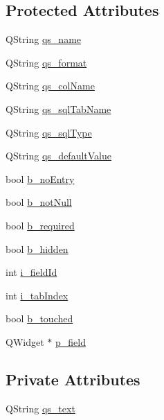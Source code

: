 \subsection*{Protected Attributes}
\begin{DoxyCompactItemize}
\item 
QString \hyperlink{classFormField_a7678a3e5f30d707b47b4b1a23a9bd80d}{qs\_\-name}
\item 
QString \hyperlink{classFormField_ac8f496b75a15cf55a93c5bbd0cd3c037}{qs\_\-format}
\item 
QString \hyperlink{classFormField_ad05d2212596727bd118e8b2c1f57f7b7}{qs\_\-colName}
\item 
QString \hyperlink{classFormField_a525f52fa7e6e96ee123d77eb1e81ab1f}{qs\_\-sqlTabName}
\item 
QString \hyperlink{classFormField_a64e90014c3119fd3981be4fcceacf361}{qs\_\-sqlType}
\item 
QString \hyperlink{classFormField_aa2bdc2d8032046b7ed7645c8a8e21ba2}{qs\_\-defaultValue}
\item 
bool \hyperlink{classFormField_a4623e1801da0e00ab26dc269a6d20caf}{b\_\-noEntry}
\item 
bool \hyperlink{classFormField_ad65ad13b03617a86b52ea49312aa9dac}{b\_\-notNull}
\item 
bool \hyperlink{classFormField_ad99a28a6bd3a93e1e3917d95f29d3ed7}{b\_\-required}
\item 
bool \hyperlink{classFormField_ab9d3090ff6e5c9f324c693c6fc583268}{b\_\-hidden}
\item 
int \hyperlink{classFormField_a19f3e77df8c8caf716c3539f49405d96}{i\_\-fieldId}
\item 
int \hyperlink{classFormField_ac4fd32b1bbf15117330290e4116e552a}{i\_\-tabIndex}
\item 
bool \hyperlink{classFormField_a09105b3e8fc915c9f2bf327fa2723723}{b\_\-touched}
\item 
QWidget $\ast$ \hyperlink{classFormField_ab7f3ad82c182c8a4989713f3f1816184}{p\_\-field}
\end{DoxyCompactItemize}
\subsection*{Private Attributes}
\begin{DoxyCompactItemize}
\item 
QString \hyperlink{classFormField_a1263d00231a1badf214a51c4062f9118}{qs\_\-text}
\end{DoxyCompactItemize}


